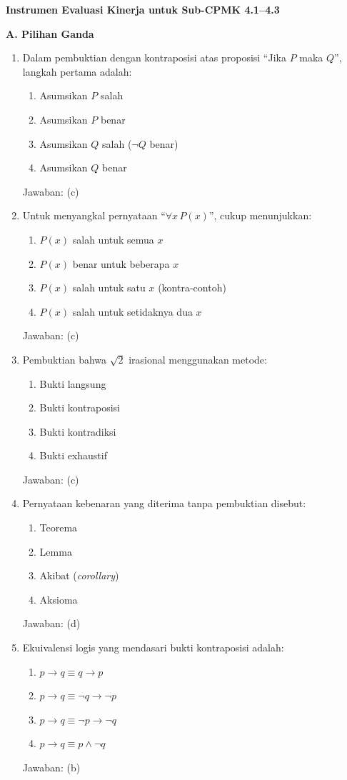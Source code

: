 \documentclass[../main]{subfiles}
\begin{document}
\begin{asesmen}
\textbf{Instrumen Evaluasi Kinerja untuk Sub-CPMK 4.1--4.3}

\textbf{A. Pilihan Ganda}
\begin{enumerate}
  \item Dalam pembuktian dengan kontraposisi atas proposisi ``Jika $P$ maka $Q$'', langkah pertama adalah:
  \begin{enumerate}
    \item Asumsikan $P$ salah
    \item Asumsikan $P$ benar
    \item Asumsikan $Q$ salah ($\neg Q$ benar)
    \item Asumsikan $Q$ benar
  \end{enumerate}
  Jawaban: (c)

  \item Untuk menyangkal pernyataan ``$\forall x\, P(x)$'', cukup menunjukkan:
  \begin{enumerate}
    \item $P(x)$ salah untuk semua $x$
    \item $P(x)$ benar untuk beberapa $x$
    \item $P(x)$ salah untuk satu $x$ (kontra-contoh)
    \item $P(x)$ salah untuk setidaknya dua $x$
  \end{enumerate}
  Jawaban: (c)

  \item Pembuktian bahwa $\sqrt{2}$ irasional menggunakan metode:
  \begin{enumerate}
    \item Bukti langsung
    \item Bukti kontraposisi
    \item Bukti kontradiksi
    \item Bukti exhaustif
  \end{enumerate}
  Jawaban: (c)

  \item Pernyataan kebenaran yang diterima tanpa pembuktian disebut:
  \begin{enumerate}
    \item Teorema
    \item Lemma
    \item Akibat (\textit{corollary})
    \item Aksioma
  \end{enumerate}
  Jawaban: (d)

  \item Ekuivalensi logis yang mendasari bukti kontraposisi adalah:
  \begin{enumerate}
    \item $p \rightarrow q \equiv q \rightarrow p$
    \item $p \rightarrow q \equiv \neg q \rightarrow \neg p$
    \item $p \rightarrow q \equiv \neg p \rightarrow \neg q$
    \item $p \rightarrow q \equiv p \wedge \neg q$
  \end{enumerate}
  Jawaban: (b)
\end{enumerate}


\end{asesmen}
\end{document}
